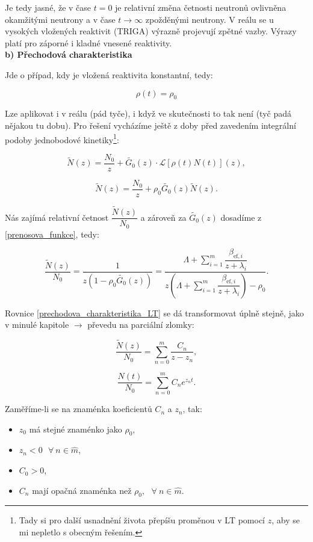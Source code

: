 Je tedy jasné, že v čase $t=0$ je relativní změna četnosti neutronů ovlivněna okamžitými neutrony a v čase $t \rightarrow \infty$ zpožděnými neutrony. V reálu se u vysokých vložených reaktivit (TRIGA) výrazně projevují zpětné vazby. Výrazy platí pro záporné i kladné vnesené reaktivity.\\

\textbf{b) Přechodová charakteristika}

Jde o případ, kdy je vložená reaktivita konstantní, tedy:

$$\rho(t) = \rho_0$$

Lze aplikovat i v reálu (pád tyče), i když ve skutečnosti to tak není (tyč padá nějakou tu dobu). Pro řešení vycházíme ještě z doby před zavedením integrální podoby jednobodové kinetiky\footnote{Tady si pro další usnadnění života přepíšu proměnou v LT pomocí $z$, aby se mi nepletlo s obecným řešením.}:

$$ \tilde{N}(z) = \dfrac{N_0}{z} + \tilde{G_0}(z) \cdot \mathcal{L}[\rho(t) N(t)](z), $$

$$ \tilde{N}(z) = \dfrac{N_0}{z} + \rho_0 \tilde{G_0}(z) \tilde{N}(z).$$

Nás zajímá relativní četnost $\dfrac{\tilde{N}(z)}{N_0}$ a zároveň za $\tilde{G_0}(z)$ dosadíme z \eqref{prenosova_funkce}, tedy:

\begin{equation}
  \boxed{
  \dfrac{\tilde{N}(z)}{N_0} = \dfrac{1}{z \left ( 1-\rho_0 \tilde{G_0}(z) \right )} = \dfrac{\Lambda + \sum_{i = 1}^m \dfrac{\beta_{\text{ef},i}}{z + \lambda_i}}{z \left ( \Lambda + \sum_{i = 1}^m \dfrac{\beta_{\text{ef},i}}{z + \lambda_i} \right ) - \rho_0}.
  \label{prechodova_charakteristika_LT}}
\end{equation}

Rovnice \eqref{prechodova_charakteristika_LT} se dá transformovat úplně stejně, jako v minulé kapitole $\rightarrow$ převedu na parciální zlomky:

$$ \dfrac{\tilde{N}(z)}{N_0} = \sum_{n=0}^m \dfrac{C_n}{z-z_n}, $$

\begin{equation}
  \boxed{
  \dfrac{N(t)}{N_0} = \sum_{n=0}^m C_n e^{z_n t}.
  \label{prechodova_charakteristika}}
\end{equation}

Zaměříme-li se na znaménka koeficientů $C_n$ a $z_n$, tak:

\begin{itemize}
  \item $z_0$ má stejné znaménko jako $\rho_0$,
  \item $z_n < 0 \: \: \: \forall \: n \in \widehat{m}$,
  \item $C_0 > 0$,
  \item $C_n$ mají opačná znaménka než $\rho_0, \: \: \: \forall \: n \in \widehat{m}$.
\end{itemize}

